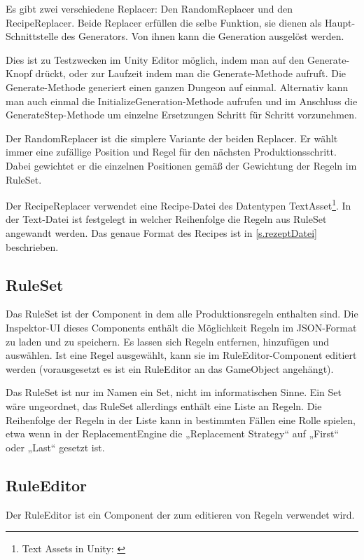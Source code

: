 Es gibt zwei verschiedene Replacer: Den RandomReplacer und den RecipeReplacer. Beide Replacer erfüllen die selbe Funktion, sie dienen als Haupt-Schnittstelle des Generators. Von ihnen kann die Generation ausgelöst werden.

Dies ist zu Testzwecken im Unity Editor möglich, indem man auf den Generate-Knopf drückt, oder zur Laufzeit indem man die Generate-Methode aufruft. Die Generate-Methode generiert einen ganzen Dungeon auf einmal. Alternativ kann man auch einmal die InitializeGeneration-Methode aufrufen und im Anschluss die GenerateStep-Methode um einzelne Ersetzungen Schritt für Schritt vorzunehmen.

Der RandomReplacer ist die simplere Variante der beiden Replacer. Er wählt immer eine zufällige Position und Regel für den nächsten Produktionsschritt. Dabei gewichtet er die einzelnen Positionen gemäß der Gewichtung der Regeln im RuleSet.

Der RecipeReplacer verwendet eine Recipe-Datei des Datentypen TextAsset\footnote{Text Assets in Unity: \cite[Seite: class-TextAsset]{unityManual}}. In der Text-Datei ist festgelegt in welcher Reihenfolge die Regeln aus RuleSet angewandt werden. Das genaue Format des Recipes ist in \ref{s.rezeptDatei} beschrieben.

\subsection{RuleSet}

Das RuleSet ist der Component in dem alle Produktionsregeln enthalten sind. Die Inspektor-UI dieses Components enthält die Möglichkeit Regeln im JSON-Format zu laden und zu speichern. Es lassen sich Regeln entfernen, hinzufügen und auswählen. Ist eine Regel ausgewählt, kann sie im RuleEditor-Component editiert werden (vorausgesetzt es ist ein RuleEditor an das GameObject angehängt).

Das RuleSet ist nur im Namen ein Set, nicht im informatischen Sinne. Ein Set wäre ungeordnet, das RuleSet allerdings enthält eine Liste an Regeln. Die Reihenfolge der Regeln in der Liste kann in bestimmten Fällen eine Rolle spielen, etwa wenn in der ReplacementEngine die „Replacement Strategy“ auf „First“ oder „Last“ gesetzt ist.

\subsection{RuleEditor}\label{ss.ruleEditor}

Der RuleEditor ist ein Component der zum editieren von Regeln verwendet wird. 

